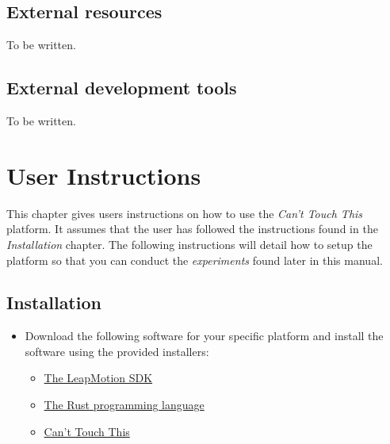 \documentclass[a4paper]{article}
\providecommand{\tightlist}{%
\setlength{\itemsep}{0pt}\setlength{\parskip}{0pt}}
\begin{document}
  \subsection{External resources}
  To be written.

  \subsection{External development tools}
  To be written.
  \clearpage


  \section{User Instructions}
  This chapter gives users instructions on how to use the \textit{Can't Touch
    This} platform. It assumes that the user has followed the instructions found
  in the \textit{Installation} chapter. The following instructions will detail
  how to setup the platform so that you can conduct the \textit{experiments}
  found later in this manual.

  \subsection{Installation}
  \begin{itemize}
    \tightlist
    \item Download the following software for your specific platform and install
      the software using the provided installers:
      \begin{itemize}
        \tightlist
        \item \href{https://developer.leapmotion.com/sdk/v2}{The LeapMotion SDK}
        \item \href{https://rust-lang.org}{The Rust programming language}
        \item \href{https://gitlab.com/timvisee/cant-touch-this}{Can't Touch This}
      \end{itemize}
  \end{itemize}
\end{document}
